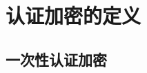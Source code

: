 \section{认证加密的定义}\label{sec:9-1}

\begin{game}[密文完整性]\label{game:9-1}
	
\end{game}

\begin{definition}\label{def:9-1}
	
\end{definition}

\begin{definition}\label{def:9-2}
	
\end{definition}

\subsection{一次性认证加密}\label{subsec:9-1-1}

\begin{definition}\label{def:9-3}
	
\end{definition}

\begin{definition}\label{def:9-4}

\end{definition}